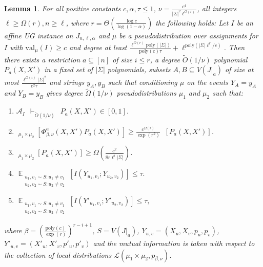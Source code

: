 \documentclass[11pt]{article}
\DeclareMathOperator*{\E}{\mathbb{E}}
\DeclareMathOperator*{\pE}{\widetilde{\mathbb{E}}}
\def \cA {\mathcal{A}}
\def \cL {\mathcal{L}}
\def \poly {\mathrm{poly}}
\def \val {\mathrm{val}}
\newtheorem{lemma}[theorem]{Lemma}
\theoremstyle{definition}
\begin{document}
\begin{lemma}\label{lem:sp-j-low-comp}
For all positive constants $c, \alpha, \tau \leq 1$, $\nu = \frac{c^4}{|\Sigma|^2\ell^{O(r)}}$, all integers $\ell \geq \Omega(r), n \geq \ell$, where $r = \Theta(\frac{\log c}{\log(1-\alpha)})$ the following holds: Let $I$ be an affine UG instance on $J_{n,\ell,\alpha}$ and $\mu$ be a pseudodistribution over assignments for $I$ with $\val_\mu(I) \geq c$ and degree at least $ \frac{\ell^{O(r)}\poly(|\Sigma|)}{\poly(c)\tau}+ \ell^{\poly(|\Sigma|\ell^r/c)}$. Then there exists a restriction $a \subseteq [n]$ of size $i \leq r$, a degree $\widetilde{O}(1/\nu)$ polynomial $P_a(X,X')$ in a fixed set of $|\Sigma|$ polynomials, subsets $A, B \subseteq V(J|_a)$ of size at most $\frac{\ell^{O(i)}|\Sigma|^2}{c^2\tau}$ and strings $y_A, y_B$ such that conditioning $\mu$ on the events $Y_A = y_A$ and $Y_B = y_B$ gives degree $\widetilde{\Omega}(1/\nu)$ pseudodistributions $\mu_1$ and $\mu_2$ such that:
\begin{enumerate}
\item $\cA_I  ~~\vdash_{\widetilde{O}(1/\nu)} ~~ P_a(X,X') \in [0,1]$.
\item $\pE_{\mu_1 \times \mu_2}[\Phi^a_{\beta,\nu}(X,X')P_a(X,X')] \geq \frac{c^{\Omega(r)}}{\exp(r^2)} \pE[P_a(X,X')]$.
\item $\pE_{\mu_1 \times \mu_2}[P_a(X,X')] \geq \Omega\left(\frac{c^2}{8r\ell^i|\Sigma|}\right)$.
\item $\E_{\substack{u_1,v_1 \sim S: u_1 \neq v_1\\ u_2,v_2 \sim S: u_2 \neq v_2}}[I(Y_{u_1,v_1};Y_{u_2,v_2})] \leq \tau.$
\item $\E_{\substack{u_1,v_1 \sim S: u_1 \neq v_1\\ u_2,v_2 \sim S: u_2 \neq v_2}}[I(Y'_{u_1,v_1};Y'_{u_2,v_2})] \leq \tau,$
\end{enumerate}
where $\beta = \left(\frac{\poly(c)}{\exp(r)}\right)^{r-i+1}$, $S = V(J|_a)$, $Y_{u,v} = (X_u,X_v,p_u,p_v)$, $Y'_{u,v} = (X'_u,X'_v,p'_u,p'_v)$ and the mutual information is taken with respect to the collection of local distributions $\cL(\mu_1 \times \mu_2,p_{\beta,\nu})$. 
\end{lemma}
\end{document}
